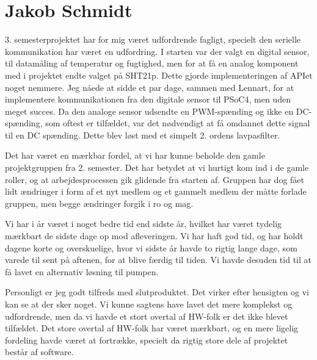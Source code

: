 \section{Jakob Schmidt}

3. semesterprojektet har for mig været udfordrende fagligt, specielt den serielle kommunikation har været en udfordring. I starten var der valgt en digital sensor, til datamåling af temperatur og fugtighed, men for at få en analog komponent med i projektet endte valget på SHT21p. Dette gjorde implementeringen af APIet noget nemmere. Jeg nåede at sidde et par dage, sammen med Lennart, for at implementere kommunikationen fra den digitale sensor til PSoC4, men uden meget succes. 
Da den analoge sensor udsendte en PWM-spænding og ikke en DC-spænding, som oftest er tilfældet, var det nødvendigt at få omdannet dette signal til en DC spænding. Dette blev løst med et simpelt 2. ordens lavpasfilter. 

Det har været en mærkbar fordel, at vi har kunne beholde den gamle projektgruppen fra 2. semester. Det har betydet at vi hurtigt kom ind i de gamle roller, og at arbejdesprocessen gik glidende fra starten af. Gruppen har dog fået lidt ændringer i form af et nyt medlem og et gammelt medlem der måtte forlade gruppen, men begge ændringer forgik i ro og mag.

Vi har i år været i noget bedre tid end sidste år, hvilket har været tydelig mærkbart de sidste dage op mod afleveringen. Vi har haft god tid, og har holdt dagene korte og overskuelige, hvor vi sidste år havde to rigtig lange dage, som varede til sent på aftenen, for at blive færdig til tiden. 
Vi havde desuden tid til at få lavet en alternativ løsning til pumpen.

Personligt er jeg godt tilfreds med slutproduktet. Det virker efter hensigten og vi kan se at der sker noget. Vi kunne sagtens have lavet det mere komplekst og udfordrende, men da vi havde et stort overtal af HW-folk er det ikke blevet tilfældet. Det store overtal af HW-folk har været mærkbart, og en mere ligelig fordeling havde været at fortrække, specielt da rigtig store dele af projektet består af software. 
